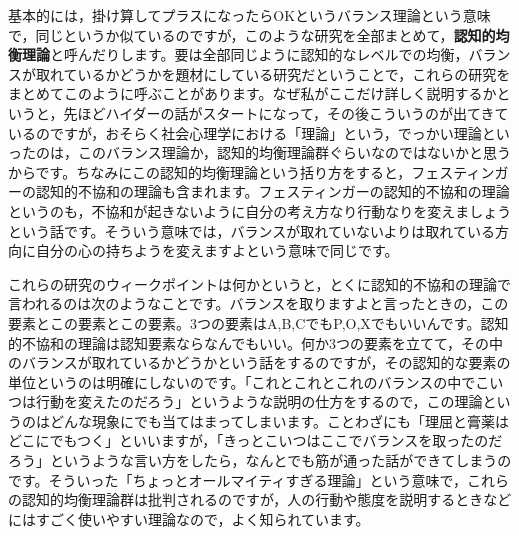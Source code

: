 \documentclass{ltjsbook}
\begin{document}
基本的には，掛け算してプラスになったらOKというバランス理論という意味で，同じというか似ているのですが，このような研究を全部まとめて，\textbf{認知的均衡理論}と呼んだりします。要は全部同じように認知的なレベルでの均衡，バランスが取れているかどうかを題材にしている研究だということで，これらの研究をまとめてこのように呼ぶことがあります。なぜ私がここだけ詳しく説明するかというと，先ほどハイダーの話がスタートになって，その後こういうのが出てきているのですが，おそらく社会心理学における「理論」という，でっかい理論といったのは，このバランス理論か，認知的均衡理論群ぐらいなのではないかと思うからです。ちなみにこの認知的均衡理論という括り方をすると，フェスティンガーの認知的不協和の理論も含まれます。フェスティンガーの認知的不協和の理論というのも，不協和が起きないように自分の考え方なり行動なりを変えましょうという話です。そういう意味では，バランスが取れていないよりは取れている方向に自分の心の持ちようを変えますよという意味で同じです。

これらの研究のウィークポイントは何かというと，とくに認知的不協和の理論で言われるのは次のようなことです。バランスを取りますよと言ったときの，この要素とこの要素とこの要素。3つの要素はA,B,CでもP,O,Xでもいいんです。認知的不協和の理論は認知要素ならなんでもいい。何か3つの要素を立てて，その中のバランスが取れているかどうかという話をするのですが，その認知的な要素の単位というのは明確にしないのです。「これとこれとこれのバランスの中でこいつは行動を変えたのだろう」というような説明の仕方をするので，この理論というのはどんな現象にでも当てはまってしまいます。ことわざにも「理屈と膏薬はどこにでもつく」といいますが，「きっとこいつはここでバランスを取ったのだろう」というような言い方をしたら，なんとでも筋が通った話ができてしまうのです。そういった「ちょっとオールマイティすぎる理論」という意味で，これらの認知的均衡理論群は批判されるのですが，人の行動や態度を説明するときなどにはすごく使いやすい理論なので，よく知られています。

\vspace{2cm}
\end{document}
